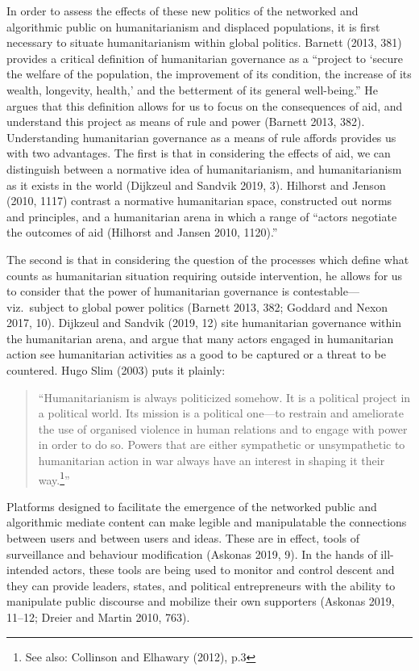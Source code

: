In order to assess the effects of these new politics of the networked
and algorithmic public on humanitarianism and displaced populations, it
is first necessary to situate humanitarianism within global politics.
Barnett (2013, 381) provides a critical definition of humanitarian
governance as a ``project to `secure the welfare of the population, the
improvement of its condition, the increase of its wealth, longevity,
health,' and the betterment of its general well-being.'' He argues that
this definition allows for us to focus on the consequences of aid, and
understand this project as means of rule and power (Barnett 2013, 382).
Understanding humanitarian governance as a means of rule affords
provides us with two advantages. The first is that in considering the
effects of aid, we can distinguish between a normative idea of
humanitarianism, and humanitarianism as it exists in the world (Dijkzeul
and Sandvik 2019, 3). Hilhorst and Jenson (2010, 1117) contrast a
normative humanitarian space, constructed out norms and principles, and
a humanitarian arena in which a range of ``actors negotiate the outcomes
of aid (Hilhorst and Jansen 2010, 1120).''

The second is that in considering the question of the processes which
define what counts as humanitarian situation requiring outside
intervention, he allows for us to consider that the power of
humanitarian governance is contestable---viz.~subject to global power
politics (Barnett 2013, 382; Goddard and Nexon 2017, 10). Dijkzeul and
Sandvik (2019, 12) site humanitarian governance within the humanitarian
arena, and argue that many actors engaged in humanitarian action see
humanitarian activities as a good to be captured or a threat to be
countered. Hugo Slim (2003) puts it plainly:

\begin{quote}
``Humanitarianism is always politicized somehow. It is a political
project in a political world. Its mission is a political one---to
restrain and ameliorate the use of organised violence in human relations
and to engage with power in order to do so. Powers that are either
sympathetic or unsympathetic to humanitarian action in war always have
an interest in shaping it their way.\footnote{See also: Collinson and
  Elhawary (2012), p.3}''
\end{quote}

Platforms designed to facilitate the emergence of the networked public
and algorithmic mediate content can make legible and manipulatable the
connections between users and between users and ideas. These are in
effect, tools of surveillance and behaviour modification (Askonas 2019,
9). In the hands of ill-intended actors, these tools are being used to
monitor and control descent and they can provide leaders, states, and
political entrepreneurs with the ability to manipulate public discourse
and mobilize their own supporters (Askonas 2019, 11--12; Dreier and
Martin 2010, 763).

